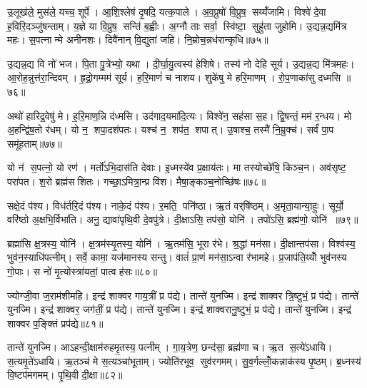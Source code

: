 उ॒लूख॑ले॒ मुस॑ले॒ यच्च॒ शूर्पे। आ॒शि॒श्लेष॑ दृ॒षदि॒ यत्क॒पाले। अ॒व॒प्रुषो॑ वि॒प्रुष॒ सय्यँ॑जामि। विश्वे॑ दे॒वा ह॒विरि॒दञ्जु॑षन्ताम्। य॒ज्ञे या वि॒प्रुष॒ सन्ति॑ ब॒ह्वीः। अ॒ग्नौ ताः सर्वा॒ स्वि॑ष्टा॒ सुहु॑ता जुहोमि। उ॒द्यन्न॒द्यमि॑त्र महः। स॒पत्नान्मे अनीनशः। दिवै॑नान् वि॒द्युता॑ जहि। नि॒म्रोच॒न्नध॑रान्कृधि॥७५॥

उ॒द्यन्न॒द्य वि नो॑ भज। पि॒ता पु॒त्रेभ्यो॒ यथा। दी॒र्घा॒यु॒त्वस्य॑ हेशिषे। तस्य॑ नो देहि सूर्य। उ॒द्यन्न॒द्य मि॑त्रमहः। आ॒रोह॒न्नुत्त॑रा॒न्दिवम्। हृ॒द्रो॒गम्मम॑ सूर्य। ह॒रि॒माणं॑ च नाशय। शुके॑षु मे हरि॒माणम्। रो॒प॒णाका॑सु दध्मसि ॥७६॥

अथो॑ हारिद्र॒वेषु॑ मे। ह॒रि॒माण॒न्नि द॑ध्मसि। उद॑गाद॒यमा॑दि॒त्यः। विश्वे॑न॒ सह॑सा स॒ह। द्वि॒षन्तं॒ मम॑ र॒न्धय\sn{}। मो अ॒हन्द्वि॑ष॒तो र॑धम्। यो न॒ शपा॒दश॑पतः। यश्च॑ न॒ शप॑त॒ शपात्। उ॒षाश्च॒ तस्मै॑ नि॒म्रुक्च॑। सर्वं॑ पा॒प समू॑हताम्॥७७॥

यो न॑ स॒पत्नो॒ यो रण॑। मर्तो॑ऽभि॒दास॑ति देवाः। इ॒ध्मस्ये॑व प्र॒क्षाय॑तः। मा तस्योच्छे॑षि॒ किञ्च॒न। अव॑सृष्ट॒ परा॑पत। श॒रो ब्रह्म॑सशितः। गच्छा॒ऽमित्रा॒न्प्र वि॑श। मैषा॒ङ्कञ्च॒नोच्छि॑षः॥७८॥\anuvakamend[पति॑ प्र॒जाप॑तये तप॒स्वी वा॒चा सौभ॑गाय प॒शून्मे॑ पिन्वस्व दुर्मरा॒युं दे॑व॒याना॑नग्ने॒ऽन्तरि॑क्षे॒ऽहमुत्त॑रो भूयासं प्र॒जाप॑तिरसि स॒र्वत॑ श्रि॒तः प्रवि॑ष्टन्दे॒वता॑भिर्वाज॒जितं॑ पृथि॒वी ह्व॑यताम॒ग्निराग्नीध्राद्वृश्चत ससृ॒वास हु॒ते स्यो॒नेन॑ मे॒ सन्ति॑ष्ठस्वे॒तः कृ॑धि दध्मस्यूहताम॒ष्टौ च॑]

सक्षे॒दं प॑श्य। विध॑र्तरि॒दं प॑श्य। नाके॒दं प॑श्य। र॒मति॒ पनि॑ष्ठा। ऋ॒तं वर्‌षि॑ष्ठम्। अ॒मृता॒यान्या॒हुः। सूर्यो॒ वरि॑ष्ठो अ॒क्षभि॒र्विभा॑ति। अनु॒ द्यावा॑पृथि॒वी दे॒वपु॑त्रे। दी॒क्षाऽसि॒ तप॑सो॒ योनि॑। तपो॑ऽसि॒ ब्रह्म॑णो॒ योनि॑ ॥७९॥

ब्रह्मा॑सि क्ष॒त्रस्य॒ योनि॑। क्ष॒त्रम॑स्यृ॒तस्य॒ योनि॑। ऋ॒तम॑सि॒ भूरा र॑भे। श्र॒द्धां मन॑सा। दी॒क्षान्तप॑सा। विश्व॑स्य॒ भुव॑न॒स्याधि॑पत्नीम्। सर्वे॒ कामा॒ यज॑मानस्य सन्तु। वातं॑ प्रा॒णं मन॑सा॒ऽन्वा र॑भामहे। प्र॒जाप॑ति॒य्योँ भुव॑नस्य गो॒पाः। स नो॑ मृ॒त्योस्त्रा॑यतां॒ पात्वह॑सः॥८०॥

ज्योग्जी॒वा ज॒राम॑शीमहि। इन्द्र॑ शाक्वर गाय॒त्रीं प्र प॑द्ये। तान्ते॑ युनज्मि। इन्द्र॑ शाक्वर त्रि॒ष्टुभं॒ प्र प॑द्ये। तान्ते॑ युनज्मि। इन्द्र॑ शाक्वर॒ जग॑तीं॒ प्र प॑द्ये। तान्ते॑ युनज्मि। इन्द्र॑ शाक्वरानु॒ष्टुभं॒ प्र प॑द्ये। तान्ते॑ युनज्मि। इन्द्र॑ शाक्वर प॒ङ्क्तिं प्रप॑द्ये॥८१॥

तान्ते॑ युनज्मि। आऽहन्दी॒क्षाम॑रुहमृ॒तस्य॒ पत्नीम्। गा॒य॒त्रेण॒ छन्द॑सा॒ ब्रह्म॑णा च। ऋ॒त स॒त्ये॑ऽधायि। स॒त्यमृ॒ते॑ऽधायि। ऋ॒तञ्च॑ मे स॒त्यञ्चा॑भूताम्। ज्योति॑रभूव॒ सुव॑रगमम्। सु॒व॒र्गल्लोँ॒कन्नाक॑स्य पृ॒ष्ठम्। ब्र॒ध्नस्य॑ वि॒ष्टप॑मगमम्। पृ॒थि॒वी दी॒क्षा॥८२॥

